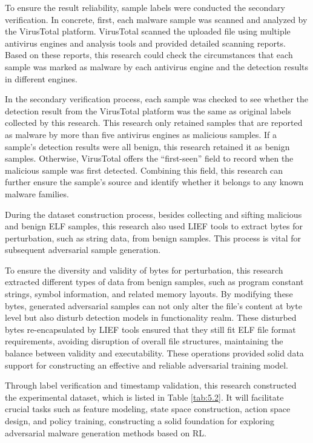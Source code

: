 To ensure the result reliability, sample labels were conducted the secondary verification. In concrete, first, each malware sample was scanned and analyzed by the VirusTotal platform. VirusTotal scanned the uploaded file using multiple antivirus engines and analysis tools and provided detailed scanning reports. Based on these reports, this research could check the circumstances that each sample was marked as malware by each antivirus engine and the detection results in different engines.

In the secondary verification process, each sample was checked to see whether the detection result from the VirusTotal platform was the same as original labels collected by this research. This research only retained samples that are reported as malware by more than five antivirus engines as malicious samples. If a sample's detection results were all benign, this research retained it as benign samples. Otherwise, VirusTotal offers the “first-seen” field to record when the malicious sample was first detected. Combining this field, this research can further ensure the sample's source and identify whether it belongs to any known malware families.

During the dataset construction process, besides collecting and sifting malicious and benign ELF samples, this research also used LIEF tools to extract bytes for perturbation, such as string data, from benign samples. This process is vital for subsequent adversarial sample generation.

To ensure the diversity and validity of bytes for perturbation, this research extracted different types of data from benign samples, such as program constant strings, symbol information, and related memory layouts. By modifying these bytes, generated adversarial samples can not only alter the file's content at byte level but also disturb  detection models in functionality realm. These disturbed bytes re-encapsulated by LIEF tools ensured that they still fit ELF file format requirements, avoiding disruption of overall file structures, maintaining the balance between validity and executability. These operations provided solid data support for constructing an effective and reliable adversarial training model.

Through label verification and timestamp validation, this research constructed the experimental dataset, which is listed in Table \ref{tab:5.2}. It will facilitate crucial tasks such as feature modeling, state space construction, action space design, and policy training, constructing a solid foundation for exploring adversarial malware generation methods based on RL.  

